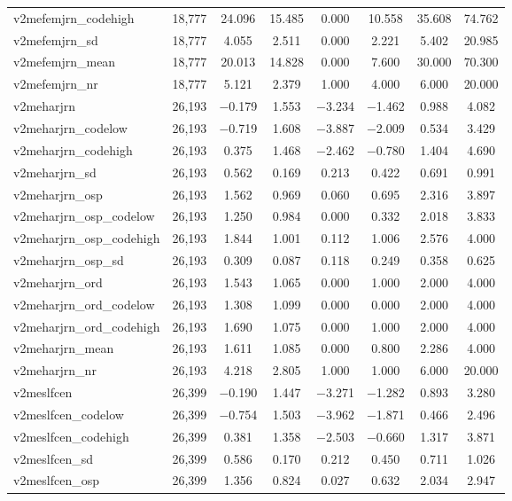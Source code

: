 \begin{table}[!htbp]
\begin{tabular}{@{\extracolsep{5pt}}lccccccc}
v2mefemjrn\_codehigh & 18,777 & 24.096 & 15.485 & 0.000 & 10.558 & 35.608 & 74.762 \\ 
v2mefemjrn\_sd & 18,777 & 4.055 & 2.511 & 0.000 & 2.221 & 5.402 & 20.985 \\ 
v2mefemjrn\_mean & 18,777 & 20.013 & 14.828 & 0.000 & 7.600 & 30.000 & 70.300 \\ 
v2mefemjrn\_nr & 18,777 & 5.121 & 2.379 & 1.000 & 4.000 & 6.000 & 20.000 \\ 
v2meharjrn & 26,193 & $-$0.179 & 1.553 & $-$3.234 & $-$1.462 & 0.988 & 4.082 \\ 
v2meharjrn\_codelow & 26,193 & $-$0.719 & 1.608 & $-$3.887 & $-$2.009 & 0.534 & 3.429 \\ 
v2meharjrn\_codehigh & 26,193 & 0.375 & 1.468 & $-$2.462 & $-$0.780 & 1.404 & 4.690 \\ 
v2meharjrn\_sd & 26,193 & 0.562 & 0.169 & 0.213 & 0.422 & 0.691 & 0.991 \\ 
v2meharjrn\_osp & 26,193 & 1.562 & 0.969 & 0.060 & 0.695 & 2.316 & 3.897 \\ 
v2meharjrn\_osp\_codelow & 26,193 & 1.250 & 0.984 & 0.000 & 0.332 & 2.018 & 3.833 \\ 
v2meharjrn\_osp\_codehigh & 26,193 & 1.844 & 1.001 & 0.112 & 1.006 & 2.576 & 4.000 \\ 
v2meharjrn\_osp\_sd & 26,193 & 0.309 & 0.087 & 0.118 & 0.249 & 0.358 & 0.625 \\ 
v2meharjrn\_ord & 26,193 & 1.543 & 1.065 & 0.000 & 1.000 & 2.000 & 4.000 \\ 
v2meharjrn\_ord\_codelow & 26,193 & 1.308 & 1.099 & 0.000 & 0.000 & 2.000 & 4.000 \\ 
v2meharjrn\_ord\_codehigh & 26,193 & 1.690 & 1.075 & 0.000 & 1.000 & 2.000 & 4.000 \\ 
v2meharjrn\_mean & 26,193 & 1.611 & 1.085 & 0.000 & 0.800 & 2.286 & 4.000 \\ 
v2meharjrn\_nr & 26,193 & 4.218 & 2.805 & 1.000 & 1.000 & 6.000 & 20.000 \\ 
v2meslfcen & 26,399 & $-$0.190 & 1.447 & $-$3.271 & $-$1.282 & 0.893 & 3.280 \\ 
v2meslfcen\_codelow & 26,399 & $-$0.754 & 1.503 & $-$3.962 & $-$1.871 & 0.466 & 2.496 \\ 
v2meslfcen\_codehigh & 26,399 & 0.381 & 1.358 & $-$2.503 & $-$0.660 & 1.317 & 3.871 \\ 
v2meslfcen\_sd & 26,399 & 0.586 & 0.170 & 0.212 & 0.450 & 0.711 & 1.026 \\ 
v2meslfcen\_osp & 26,399 & 1.356 & 0.824 & 0.027 & 0.632 & 2.034 & 2.947 \\ 

\end{tabular}
\end{table}

